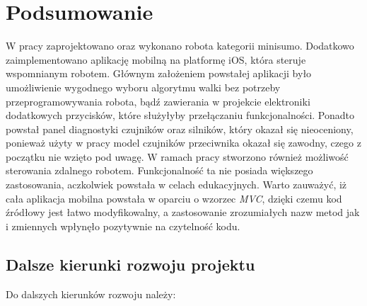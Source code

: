 \chapter{Podsumowanie}
W pracy zaprojektowano oraz wykonano robota kategorii minisumo. Dodatkowo zaimplementowano aplikację mobilną na platformę iOS, która steruje wspomnianym robotem. Głównym założeniem powstałej aplikacji było umożliwienie wygodnego wyboru algorytmu walki bez potrzeby przeprogramowywania robota, bądź zawierania w projekcie elektroniki dodatkowych przycisków, które służyłyby przełączaniu funkcjonalności. Ponadto powstał panel diagnostyki czujników oraz silników, który okazał się nieoceniony, ponieważ użyty w pracy model czujników przeciwnika okazał się zawodny, czego z początku nie wzięto pod uwagę. W ramach pracy stworzono również możliwość sterowania zdalnego robotem. Funkcjonalność ta nie posiada większego zastosowania, aczkolwiek powstała w celach edukacyjnych. Warto zauważyć, iż cała aplikacja mobilna powstała w oparciu o wzorzec \textit{MVC}, dzięki czemu kod źródłowy jest łatwo modyfikowalny, a zastosowanie zrozumiałych nazw metod jak i zmiennych wpłynęło pozytywnie na czytelność kodu.

\section{Dalsze kierunki rozwoju projektu}
Do dalszych kierunków rozwoju należy:


